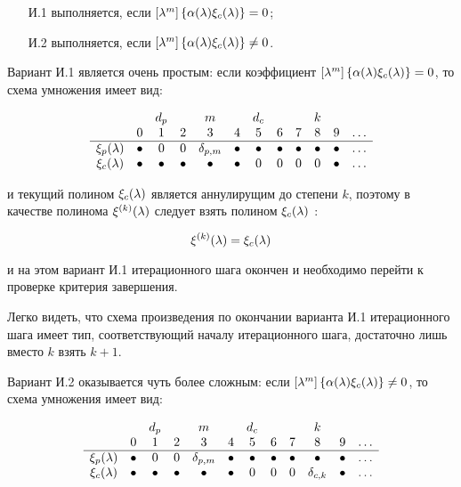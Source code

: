 \begin{itemize}
	\item [И.1] выполняется, если $\left [ \lambda^{m} \right ] \left \{ \alpha (\lambda) \xi_c (\lambda) \right \} = 0$;
	\item [И.2] выполняется, если $\left [ \lambda^{m} \right ] \left \{ \alpha (\lambda) \xi_c (\lambda) \right \} \neq 0$.
\end{itemize}

Вариант И.1 является очень простым: если коэффициент $\left [ \lambda^{m} \right ] \left \{ \alpha (\lambda) \xi_c (\lambda) \right \} = 0$, то схема умножения
имеет вид:

	$$
		\begin{array}{cccccccccccc}
			                   &         & d_p     &         & m            &         & d_c     &         &         & k       &         & \\
			                   & 0       & 1       & 2       & 3            & 4        & 5       & 6       & 7       & 8       & 9       & \dots \\
			\hline
			\xi_p (\lambda) & \bullet & 0       & 0       & \delta_{p,m} & \bullet & \bullet & \bullet & \bullet & \bullet & \bullet & \dots \\
			\xi_c (\lambda) & \bullet & \bullet & \bullet & \bullet      & \bullet & 0       & 0       & 0       & 0       & \bullet & \dots \\
		\end{array}
	$$

и текущий полином $\xi_c (\lambda)$ является аннулирущим до степени $k$, поэтому в качестве полинома $\xi^{(k)} (\lambda)$ следует взять
полином $\xi_c (\lambda)$ :

	$$ \xi^{(k)} (\lambda) = \xi_c (\lambda) $$

и на этом вариант И.1 итерационного шага окончен и необходимо перейти к проверке критерия завершения.

Легко видеть, что схема произведения по окончании варианта И.1 итерационного шага имеет тип, соответствующий началу итерационного шага,
достаточно лишь вместо $k$ взять $k+1$.

Вариант И.2 оказывается чуть более сложным: если $\left [ \lambda^{m} \right ] \left \{ \alpha (\lambda) \xi_c (\lambda) \right \} \neq 0$, то схема умножения
имеет вид:

	$$
		\begin{array}{cccccccccccc}
			                   &         & d_p     &         & m            &         & d_c     &         &         & k            &         & \\
			                   & 0       & 1       & 2       & 3            & 4       & 5       & 6       & 7       & 8            & 9       & \dots \\
			\hline
			\xi_p (\lambda) & \bullet & 0       & 0       & \delta_{p,m} & \bullet & \bullet & \bullet & \bullet & \bullet      & \bullet & \dots \\
			\xi_c (\lambda) & \bullet & \bullet & \bullet & \bullet      & \bullet & 0       & 0       & 0       & \delta_{c,k} & \bullet & \dots \\
		\end{array}
	$$


